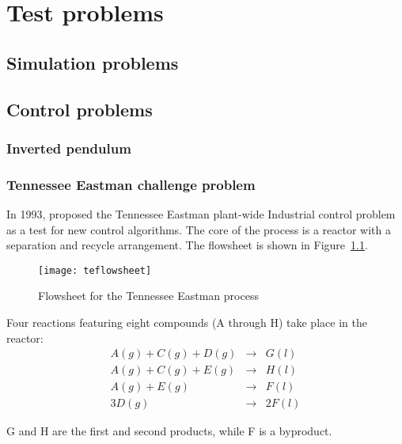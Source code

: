 \chapter{Test problems}

\section{Simulation problems}


\section{Control problems}
\subsection{Inverted pendulum}

\subsection{Tennessee Eastman challenge problem}
In 1993, \citet{downs.vogel1993plant-wide} proposed the Tennessee
Eastman plant-wide Industrial control problem as a test for new
control algorithms. The core of the process is a reactor with
a separation and recycle arrangement.  The flowsheet is shown in
Figure~\ref{fig:teprocess}.
\begin{figure}[htbp]
  \centering
  \texttt{[image: teflowsheet]}
  \caption{Flowsheet for the Tennessee Eastman process~\citep{tenesseeeastman}}
  \label{fig:teprocess}
\end{figure}

Four reactions featuring eight compounds (A through H) take place in the reactor:
\begin{eqnarray}
A(g) + C(g) + D(g) & \rightarrow & G(l) \\
A(g) + C(g) + E(g) & \rightarrow & H(l) \\
A(g) + E(g)        & \rightarrow & F(l) \\
3D(g)              & \rightarrow & 2F(l) 
\label{eq:te-reaction}
\end{eqnarray}

G and H are the first and second products, while F is a byproduct.



